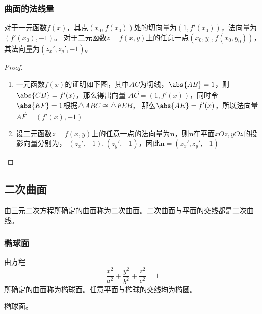 \subsubsection{曲面的法线量}
对于一元函数$f(x)$，其点$(x_0,f(x_0))$处的切向量为$(1,f'(x_0))$，法向量为$(f'(x_0),-1)$。
对于二元函数$z=f(x,y)$上的任意一点$(x_0,y_0,f(x_0,y_0))$，其法向量为$(z_x',z_y',-1)$。
\begin{marginfigure}
    \centering
\end{marginfigure}

\begin{proof}
    \begin{enumerate}[(1)]
        \item 一元函数$f(x)$的证明如下图，其中$AC$为切线，$\abs{AB}=1$，则$\abs{CB}=f'(x)$，那么得出向量
              $\overrightarrow{AC}=(1,f'(x))$，同时令$\abs{EF}=1$根据$\triangle ABC \cong\triangle FEB$，
              那么$\abs{AE}=f'(x)$，所以法向量$\overrightarrow{AF}=(f'(x),-1)$

        \item 设二元函数$z=f(x,y)$上的任意一点的法向量为$\bm{n}$，则$\bm{n}$在平面$xOz, yOz$的投影向量分别为，
              $(z_x',-1),(z_y',-1)$，因此$\bm{n} = (z_x',z_y',-1)$
    \end{enumerate}
\end{proof}

\subsection{二次曲面}
由三元二次方程所确定的曲面称为二次曲面。二次曲面与平面的交线都是二次曲线。

\subsubsection{椭球面}
由方程
\begin{equation}
    \frac{x^2}{a^2} + \frac{y^2}{b^2} + \frac{z^2}{c^2} = 1
\end{equation}
所确定的曲面称为椭球面。任意平面与椭球的交线均为椭圆。
\begin{marginfigure}
    \centering
    \caption{椭球面。}
\end{marginfigure}

